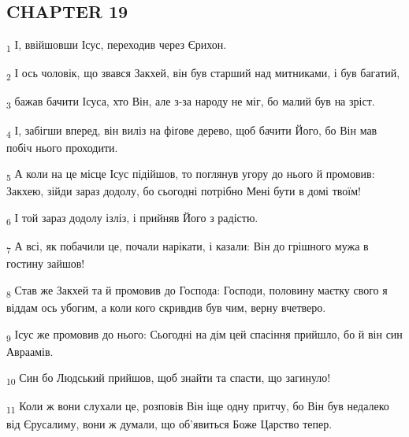 \subsection{CHAPTER 19}
\begin{tcolorbox}
\textsubscript{1} І, ввійшовши Ісус, переходив через Єрихон.
\end{tcolorbox}
\begin{tcolorbox}
\textsubscript{2} І ось чоловік, що звався Закхей, він був старший над митниками, і був багатий,
\end{tcolorbox}
\begin{tcolorbox}
\textsubscript{3} бажав бачити Ісуса, хто Він, але з-за народу не міг, бо малий був на зріст.
\end{tcolorbox}
\begin{tcolorbox}
\textsubscript{4} І, забігши вперед, він виліз на фіґове дерево, щоб бачити Його, бо Він мав побіч нього проходити.
\end{tcolorbox}
\begin{tcolorbox}
\textsubscript{5} А коли на це місце Ісус підійшов, то поглянув угору до нього й промовив: Закхею, зійди зараз додолу, бо сьогодні потрібно Мені бути в домі твоїм!
\end{tcolorbox}
\begin{tcolorbox}
\textsubscript{6} І той зараз додолу ізліз, і прийняв Його з радістю.
\end{tcolorbox}
\begin{tcolorbox}
\textsubscript{7} А всі, як побачили це, почали нарікати, і казали: Він до грішного мужа в гостину зайшов!
\end{tcolorbox}
\begin{tcolorbox}
\textsubscript{8} Став же Закхей та й промовив до Господа: Господи, половину маєтку свого я віддам ось убогим, а коли кого скривдив був чим, верну вчетверо.
\end{tcolorbox}
\begin{tcolorbox}
\textsubscript{9} Ісус же промовив до нього: Сьогодні на дім цей спасіння прийшло, бо й він син Авраамів.
\end{tcolorbox}
\begin{tcolorbox}
\textsubscript{10} Син бо Людський прийшов, щоб знайти та спасти, що загинуло!
\end{tcolorbox}
\begin{tcolorbox}
\textsubscript{11} Коли ж вони слухали це, розповів Він іще одну притчу, бо Він був недалеко від Єрусалиму, вони ж думали, що об'явиться Боже Царство тепер.
\end{tcolorbox}
